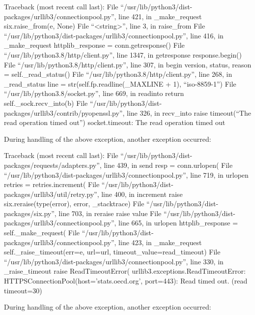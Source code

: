 \documentclass[11pt]{article}
\begin{document}
Traceback (most recent call last):
  File ``/usr/lib/python3/dist-packages/urllib3/connectionpool.py'', line 421, in \_make\_request
    six.raise\_from(e, None)
  File ``<string>'', line 3, in raise\_from
  File ``/usr/lib/python3/dist-packages/urllib3/connectionpool.py'', line 416, in \_make\_request
    httplib\_response = conn.getresponse()
  File ``/usr/lib/python3.8/http/client.py'', line 1347, in getresponse
    response.begin()
  File ``/usr/lib/python3.8/http/client.py'', line 307, in begin
    version, status, reason = self.\_read\_status()
  File ``/usr/lib/python3.8/http/client.py'', line 268, in \_read\_status
    line = str(self.fp.readline(\_MAXLINE + 1), ``iso-8859-1'')
  File ``/usr/lib/python3.8/socket.py'', line 669, in readinto
    return self.\_sock.recv\_into(b)
  File ``/usr/lib/python3/dist-packages/urllib3/contrib/pyopenssl.py'', line 326, in recv\_into
    raise timeout(``The read operation timed out'')
socket.timeout: The read operation timed out

During handling of the above exception, another exception occurred:

Traceback (most recent call last):
  File ``/usr/lib/python3/dist-packages/requests/adapters.py'', line 439, in send
    resp = conn.urlopen(
  File ``/usr/lib/python3/dist-packages/urllib3/connectionpool.py'', line 719, in urlopen
    retries = retries.increment(
  File ``/usr/lib/python3/dist-packages/urllib3/util/retry.py'', line 400, in increment
    raise six.reraise(type(error), error, \_stacktrace)
  File ``/usr/lib/python3/dist-packages/six.py'', line 703, in reraise
    raise value
  File ``/usr/lib/python3/dist-packages/urllib3/connectionpool.py'', line 665, in urlopen
    httplib\_response = self.\_make\_request(
  File ``/usr/lib/python3/dist-packages/urllib3/connectionpool.py'', line 423, in \_make\_request
    self.\_raise\_timeout(err=e, url=url, timeout\_value=read\_timeout)
  File ``/usr/lib/python3/dist-packages/urllib3/connectionpool.py'', line 330, in \_raise\_timeout
    raise ReadTimeoutError(
urllib3.exceptions.ReadTimeoutError: HTTPSConnectionPool(host='stats.oecd.org', port=443): Read timed out. (read timeout=30)

During handling of the above exception, another exception occurred:
\end{document}
